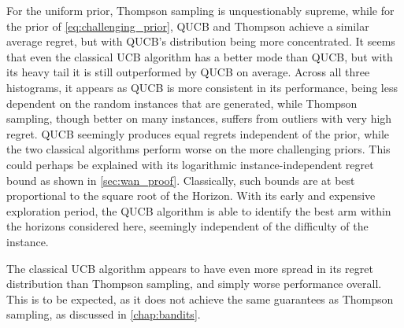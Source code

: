For the uniform prior, Thompson sampling is unquestionably supreme, while for the prior of \cref{eq:challenging_prior}, QUCB and Thompson achieve a similar average regret, but with QUCB's distribution being more concentrated.
It seems that even the classical UCB algorithm has a better mode than QUCB, but with its heavy tail it is still outperformed by QUCB on average.
Across all three histograms, it appears as QUCB is more consistent in its performance, being less dependent on the random instances that are generated, while Thompson sampling, though better on many instances, suffers from outliers with very high regret.
QUCB seemingly produces equal regrets independent of the prior, while the two classical algorithms perform worse on the more challenging priors.
This could perhaps be explained with its logarithmic instance-independent regret bound as shown in \cref{sec:wan_proof}.
Classically, such bounds are at best proportional to the square root of the Horizon.
With its early and expensive exploration period, the QUCB algorithm is able to identify the best arm within the horizons considered here, seemingly independent of the difficulty of the instance.

The classical UCB algorithm appears to have even more spread in its regret distribution than Thompson sampling, and simply worse performance overall.
This is to be expected, as it does not achieve the same guarantees as Thompson sampling, as discussed in \cref{chap:bandits}.


